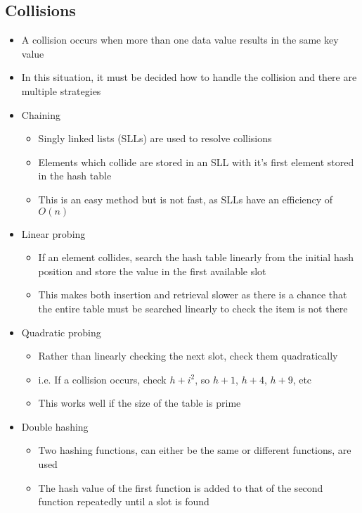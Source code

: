 \subsection*{Collisions}

\begin{itemize}
  \item A collision occurs when more than one data value results in the same key value
  \item In this situation, it must be decided how to handle the collision and there are multiple strategies
  \item Chaining
  \begin{itemize}
    \item Singly linked lists (SLLs) are used to resolve collisions
    \item Elements which collide are stored in an SLL with it's first element stored in the hash table
    \item This is an easy method but is not fast, as SLLs have an efficiency of $O(n)$
  \end{itemize}
  \item Linear probing
  \begin{itemize}
    \item If an element collides, search the hash table linearly from the initial hash position and store the value in the first available slot
    \item This makes both insertion and retrieval slower as there is a chance that the entire table must be searched linearly to check the item is not there
  \end{itemize}
  \item Quadratic probing
  \begin{itemize}
    \item Rather than linearly checking the next slot, check them quadratically
    \item i.e. If a collision occurs, check $h + i^2$, so $h + 1$, $h + 4$, $h + 9$, etc
    \item This works well if the size of the table is prime
  \end{itemize}
  \item Double hashing
  \begin{itemize}
    \item Two hashing functions, can either be the same or different functions, are used
    \item The hash value of the first function is added to that of the second function repeatedly until a slot is found

\end{itemize}
\end{itemize}
